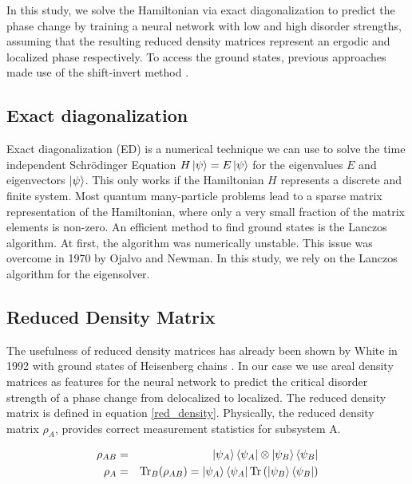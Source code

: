 \documentclass[reprint,amsmath,amssymb,aps,prb]{revtex4-2}
\begin{document}
In this study, we solve the Hamiltonian via exact diagonalization to predict the phase change by training a neural network with low and high disorder strengths, assuming that the resulting reduced density matrices represent an ergodic and localized phase respectively. To access the ground states, previous approaches made use of the shift-invert method \cite{Luitz2015}.



\subsection{Exact diagonalization}

Exact diagonalization (ED) is a numerical technique we can use to solve the time independent Schrödinger Equation $H\ket{\psi}=E\ket{\psi}$ for the eigenvalues $E$ and eigenvectors $\ket{\psi}$. This only works if the Hamiltonian $H$ represents a discrete and finite system. Most quantum many-particle problems lead to a sparse matrix representation of the Hamiltonian, where only a very small fraction of the matrix
elements is non-zero.\cite{Weisse2008} An efficient method to find ground states is the Lanczos algorithm.\cite{Lanczos1950} At first, the algorithm was numerically unstable. This issue was overcome in 1970 by Ojalvo and Newman.\cite{Ojalvo1970} In this study, we rely on the Lanczos algorithm for the eigensolver.

\subsection{Reduced Density Matrix}

The usefulness of reduced density matrices has already been shown by White in 1992 with ground states of Heisenberg chains \cite{White1992}. In our case we use areal density matrices as features for the neural network to predict the critical disorder strength of a phase change from delocalized to localized. The reduced density matrix is defined in equation \ref{red_density}. Physically, the reduced density matrix $\rho_A$, provides correct measurement statistics for subsystem A.

\begin{eqnarray}
\rho_{AB}&=&\ket{\psi_A}\bra{\psi_A}\otimes\ket{\psi_B}\bra{\psi_B}\\
\rho_A&=&\text{Tr}_B(\rho_{AB})=\ket{\psi_A}\bra{\psi_A}\text{Tr}\left(\ket{\psi_B}\bra{\psi_B}\right)\label{red_density}
\end{eqnarray}%
\end{document}
